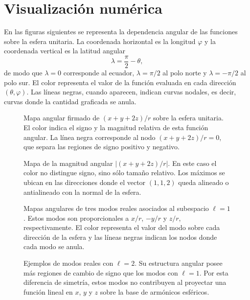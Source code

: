 \documentclass[11pt]{article}
\begin{document}
\section*{Visualización numérica}

En las figuras siguientes se representa la dependencia angular de las funciones sobre la esfera unitaria. La coordenada horizontal es la longitud $\varphi$ y la coordenada vertical es la latitud angular
\begin{equation*}
\lambda=\frac{\pi}{2}-\theta,
\end{equation*}
de modo que $\lambda=0$ corresponde al ecuador, $\lambda=\pi/2$ al polo norte y $\lambda=-\pi/2$ al polo sur. El color representa el valor de la función evaluada en cada dirección $(\theta,\varphi)$. Las líneas negras, cuando aparecen, indican curvas nodales, es decir, curvas donde la cantidad graficada se anula.

\begin{figure}[h]
\centering

\caption{Mapa angular firmado de $(x+y+2z)/r$ sobre la esfera unitaria. El color indica el signo y la magnitud relativa de esta función angular. La línea negra corresponde al nodo $(x+y+2z)/r=0$, que separa las regiones de signo positivo y negativo.}
\end{figure}

\begin{figure}[h]
\centering

\caption{Mapa de la magnitud angular $|(x+y+2z)/r|$. En este caso el color no distingue signo, sino sólo tamaño relativo. Los máximos se ubican en las direcciones donde el vector $(1,1,2)$ queda alineado o antialineado con la normal de la esfera.}
\end{figure}

\begin{figure}[h]
\centering

\caption{Mapas angulares de tres modos reales asociados al subespacio $\ell=1$. Estos modos son proporcionales a $x/r$, $-y/r$ y $z/r$, respectivamente. El color representa el valor del modo sobre cada dirección de la esfera y las líneas negras indican los nodos donde cada modo se anula.}
\end{figure}

\begin{figure}[h]
\centering

\caption{Ejemplos de modos reales con $\ell=2$. Su estructura angular posee más regiones de cambio de signo que los modos con $\ell=1$. Por esta diferencia de simetría, estos modos no contribuyen al proyectar una función lineal en $x$, $y$ y $z$ sobre la base de armónicos esféricos.}
\end{figure}
\end{document}
